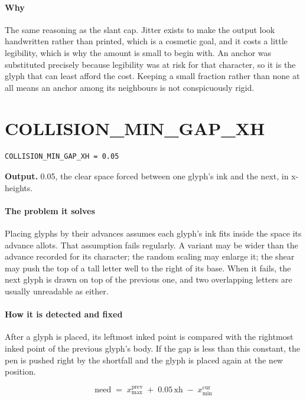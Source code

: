 \paragraph{Why}
The same reasoning as the slant cap. Jitter exists to make the output look handwritten rather than printed, which is a cosmetic goal, and it costs a little legibility, which is why the amount is small to begin with. An anchor was substituted precisely because legibility was at risk for that character, so it is the glyph that can least afford the cost. Keeping a small fraction rather than none at all means an anchor among its neighbours is not conspicuously rigid.


\section{COLLISION\_MIN\_GAP\_XH}
\begin{lstlisting}[style=sig]
COLLISION_MIN_GAP_XH = 0.05
\end{lstlisting}

\noindent\textbf{Output.} 0.05, the clear space forced between one glyph's ink and the next, in x-heights.


\paragraph{The problem it solves}
Placing glyphs by their advances assumes each glyph's ink fits inside the space its advance allots. That assumption fails regularly. A variant may be wider than the advance recorded for its character; the random scaling may enlarge it; the shear may push the top of a tall letter well to the right of its base. When it fails, the next glyph is drawn on top of the previous one, and two overlapping letters are usually unreadable as either.


\paragraph{How it is detected and fixed}
After a glyph is placed, its leftmost inked point is compared with the rightmost inked point of the previous glyph's body. If the gap is less than this constant, the pen is pushed right by the shortfall and the glyph is placed again at the new position.


\begin{equation}
\mathrm{need} \;=\; x^{\mathrm{prev}}_{\max} \;+\; 0.05\,\mathrm{xh} \;-\; x^{\mathrm{cur}}_{\min}
\end{equation}

